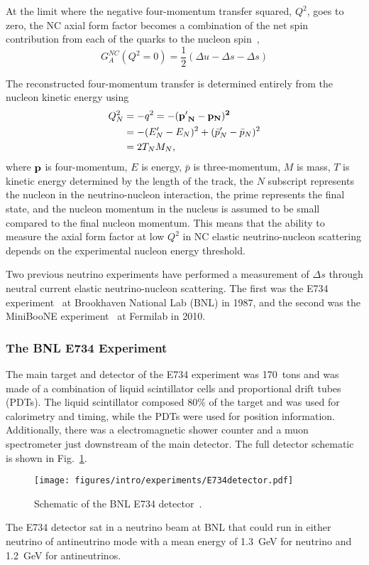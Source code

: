   At the limit where the negative four-momentum transfer squared, $Q^2$, goes
  to zero, the NC axial form factor becomes a combination of the net spin
  contribution from each of the quarks to the nucleon spin~\cite{Bass:2007zzb},
  \begin{equation*}
    G_A^{NC}(Q^2 = 0) = \frac{1}{2}(\Delta u - \Delta s - \Delta s)
  \end{equation*}

  The reconstructed four-momentum transfer is
  determined entirely from the nucleon kinetic energy using
  \begin{align*}
    Q^2_N &= -q^2 = -(\bf{p'}_N - \bf{p}_N)^2 \\
          &= -(E'_N - E_N)^2 + (\bar{p}'_N - \bar{p}_N)^2 \\
          &= 2 T_N M_N,
  \end{align*}
  where $\bf{p}$ is four-momentum, $E$ is energy, $\bar{p}$ is
  three-momentum, $M$ is mass, $T$ is kinetic energy determined by the length
  of the track, the $N$ subscript represents the nucleon in the
  neutrino-nucleon interaction, the prime represents the final state, and the
  nucleon momentum in the nucleus is assumed to be small compared to the
  final nucleon momentum. This means that the ability to measure the axial
  form factor at low $Q^2$ in NC elastic neutrino-nucleon scattering depends
  on the experimental nucleon energy threshold.

  Two previous neutrino experiments have performed a measurement of $\Delta
  s$ through neutral current elastic neutrino-nucleon scattering. The first
  was the E734 experiment~\cite{Ahrens:1986xe} at Brookhaven National Lab (BNL) in
  1987, and the second was the MiniBooNE experiment~\cite{Aguilar-Arevalo:2010cx} at
  Fermilab in 2010.

  \subsubsection{The BNL E734 Experiment}\label{sec:e734}
  The main target and detector of the E734 experiment was 170~tons and was
  made of a combination of liquid scintillator cells and proportional drift
  tubes (PDTs). The liquid scintillator composed 80\% of the target and was
  used for calorimetry and timing, while the PDTs were used for position
  information. Additionally, there was a electromagnetic shower counter and a
  muon spectrometer just downstream of the main detector. The full detector
  schematic is shown in Fig.~\ref{fig:e734detector}.
  \begin{figure}[h]
    \centering
    \texttt{[image: figures/intro/experiments/E734detector.pdf]}
    \caption{Schematic of the BNL E734 detector~\cite{Ahrens:1986xe}.}
    \label{fig:e734detector}
  \end{figure}
  The E734 detector sat in a neutrino beam at BNL that could run in either
  neutrino of antineutrino mode with a mean energy of 1.3~GeV for neutrino
  and 1.2~GeV for antineutrinos.

